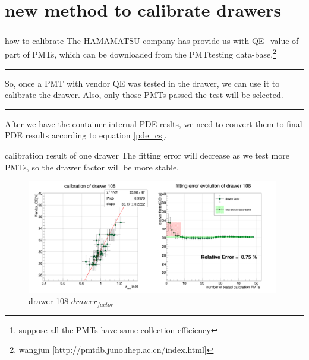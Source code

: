 \documentclass[11pt,compress,xcolor=x11names,UTF8]{beamer}
\begin{document}
\section{new method to calibrate drawers}
\begin{frame}{how to calibrate}
The HAMAMATSU company has provide us with QE\footnote{suppose all the PMTs have same  collection efficiency} value of part of PMTs, which can be downloaded from the PMTtesting data-base.\footnote{wangjun [http://pmtdb.juno.ihep.ac.cn/index.html]} 

\vspace{.5cm}
\hrule{\textwidth}
\vspace{.5cm}
So, once a PMT with vendor QE was tested in the drawer, we can use it to calibrate the drawer. Also, only those PMTs passed the test will be selected.

\vspace{.5cm}
\hrule{\textwidth}
\vspace{.5cm}
After we have the container internal PDE reslts, we need to convert them to final PDE results according to equation \ref{pde_cs}.
\end{frame}
\begin{frame}{calibration result of one drawer}
The fitting error will decrease as we test more PMTs, so the drawer factor will be more stable.
\begin{figure}
\centering
\includegraphics[width=0.98\textwidth]{sta101-7} %
\caption{drawer 108-$drawer_{factor}$}
\end{figure}
\end{frame}
\end{document}
